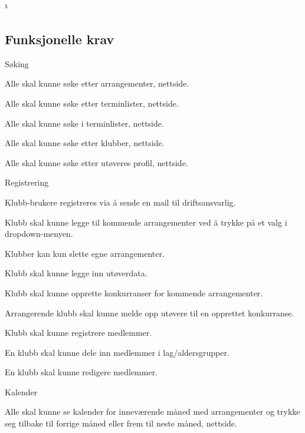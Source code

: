 ⁵\documentclass[norsk]{article}
\begin{document}
\subsection{Funksjonelle krav}
\begin{legal}
    \item Søking
    \begin{legal}
        \item Alle skal kunne søke etter arrangementer, nettside.
        \item Alle skal kunne søke etter terminlister, nettside.
        \item Alle skal kunne søke i terminlister, nettside.
        \item Alle skal kunne søke etter klubber, nettside.
        \item Alle skal kunne søke etter utøveres profil, nettside.
    \end{legal}
    \item Registrering
    \begin{legal}
        \item Klubb-brukere registreres via å sende en mail til driftsansvarlig.
        \item Klubb skal kunne legge til kommende arrangementer ved å trykke på et valg i dropdown-menyen.
        \begin{legal}
            \item Klubber kan kun slette egne arrangementer.
        \end{legal}
        \item Klubb skal kunne legge inn utøverdata.
        \item Klubb skal kunne opprette konkurranser for kommende arrangementer.
        \item Arrangerende klubb skal kunne melde opp utøvere til en opprettet konkurranse. 
        \item Klubb skal kunne registrere medlemmer.
        \begin{legal}
            \item En klubb skal kunne dele inn medlemmer i lag/aldersgrupper.
            \item En klubb skal kunne redigere medlemmer.
        \end{legal}
    \end{legal}
    \item Kalender
    \begin{legal}
        \item Alle skal kunne se kalender for inneværende måned med arrangementer og trykke seg tilbake til forrige måned eller frem til neste måned, nettside.

\end{legal}
\end{legal}
\end{document}
